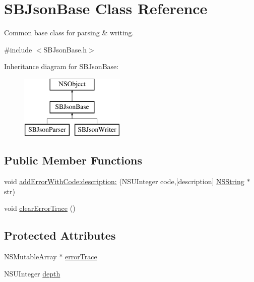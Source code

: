 \hypertarget{interface_s_b_json_base}{
\section{\-S\-B\-Json\-Base \-Class \-Reference}
\label{interface_s_b_json_base}
}


\-Common base class for parsing \& writing.  




{\ttfamily \#include $<$\-S\-B\-Json\-Base.\-h$>$}

\-Inheritance diagram for \-S\-B\-Json\-Base\-:\begin{figure}[H]
\begin{center}
\leavevmode
\includegraphics[height=3.000000cm]{interface_s_b_json_base}
\end{center}
\end{figure}
\subsection*{\-Public \-Member \-Functions}
\begin{DoxyCompactItemize}
\item 
void \hyperlink{interface_s_b_json_base_af6fc685c386c1c4528bd30b2bd630d56}{add\-Error\-With\-Code\-:description\-:} (\-N\-S\-U\-Integer code,\mbox{[}description\mbox{]} \hyperlink{class_n_s_string}{\-N\-S\-String} $\ast$str)
\item 
void \hyperlink{interface_s_b_json_base_a6a429d6db2149fea7435b9e0aac5d3fa}{clear\-Error\-Trace} ()
\end{DoxyCompactItemize}
\subsection*{\-Protected \-Attributes}
\begin{DoxyCompactItemize}
\item 
\-N\-S\-Mutable\-Array $\ast$ \hyperlink{interface_s_b_json_base_a9fd64724d5da34a0f9842cee3d14620c}{error\-Trace}
\item 
\-N\-S\-U\-Integer \hyperlink{interface_s_b_json_base_a5e80155581d240f565ec4149ad812e03}{depth}
\end{DoxyCompactItemize}
